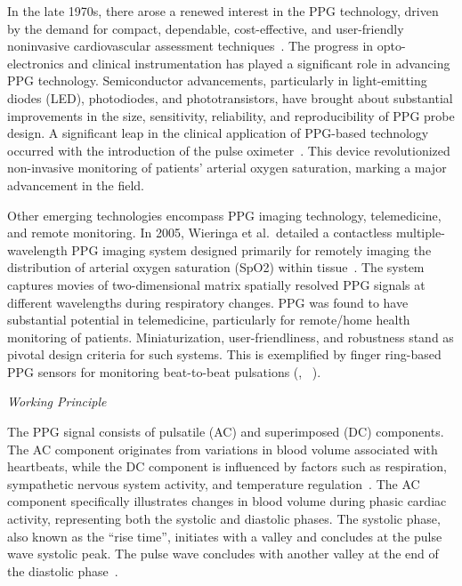 In the late 1970s, there arose a renewed interest in the PPG technology, driven by the demand for compact, dependable, cost-effective, and user-friendly noninvasive cardiovascular assessment techniques~\cite{yoshiyaSpectrophotometricMonitoringArterial1980}.
The progress in opto-electronics and clinical instrumentation has played a significant role in advancing PPG technology.
Semiconductor advancements, particularly in light-emitting diodes (LED), photodiodes, and phototransistors, have brought about substantial improvements in the size, sensitivity, reliability, and reproducibility of PPG probe design.
A significant leap in the clinical application of PPG-based technology occurred with the introduction of the pulse oximeter~\cite{aoyagiPulseOximetryIts2002}.
This device revolutionized non-invasive monitoring of patients' arterial oxygen saturation, marking a major advancement in the field.

Other emerging technologies encompass PPG imaging technology, telemedicine, and remote monitoring.
In 2005, Wieringa et al.\ detailed a contactless multiple-wavelength PPG imaging system designed primarily for remotely imaging the distribution of arterial oxygen saturation (SpO2) within tissue~\cite{wieringaContactlessMultipleWavelength2005b}.
The system captures movies of two-dimensional matrix spatially resolved PPG signals at different wavelengths during respiratory changes.
PPG was found to have substantial potential in telemedicine, particularly for remote/home health monitoring of patients.
Miniaturization, user-friendliness, and robustness stand as pivotal design criteria for such systems.
This is exemplified by finger ring-based PPG sensors for monitoring beat-to-beat pulsations (\cite{rheeArtifactresistantPowerefficientDesign2001}, ~\cite{zhengRingtypeDeviceNoninvasive2003}).


\vspace{0.2cm}
\textit{Working Principle}
\vspace{0.2cm}

The PPG signal consists of pulsatile (AC) and superimposed (DC) components.
The AC component originates from variations in blood volume associated with heartbeats, while the DC component is influenced by factors such as respiration, sympathetic nervous system activity, and temperature regulation~\cite{allenPhotoplethysmographyItsApplication2007a}.
The AC component specifically illustrates changes in blood volume during phasic cardiac activity, representing both the systolic and diastolic phases.
The systolic phase, also known as the \enquote{rise time}, initiates with a valley and concludes at the pulse wave systolic peak.
The pulse wave concludes with another valley at the end of the diastolic phase~\cite{weisslerSystolicTimeIntervals1968}.

